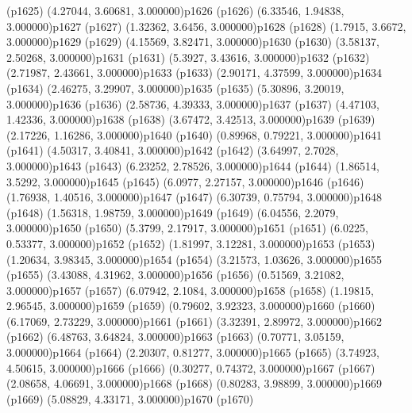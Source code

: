 \psdot(p1625)
\psPoint(4.27044, 3.60681, 3.000000){p1626}
\psdot(p1626)
\psPoint(6.33546, 1.94838, 3.000000){p1627}
\psdot(p1627)
\psPoint(1.32362, 3.6456, 3.000000){p1628}
\psdot(p1628)
\psPoint(1.7915, 3.6672, 3.000000){p1629}
\psdot(p1629)
\psPoint(4.15569, 3.82471, 3.000000){p1630}
\psdot(p1630)
\psPoint(3.58137, 2.50268, 3.000000){p1631}
\psdot(p1631)
\psPoint(5.3927, 3.43616, 3.000000){p1632}
\psdot(p1632)
\psPoint(2.71987, 2.43661, 3.000000){p1633}
\psdot(p1633)
\psPoint(2.90171, 4.37599, 3.000000){p1634}
\psdot(p1634)
\psPoint(2.46275, 3.29907, 3.000000){p1635}
\psdot(p1635)
\psPoint(5.30896, 3.20019, 3.000000){p1636}
\psdot(p1636)
\psPoint(2.58736, 4.39333, 3.000000){p1637}
\psdot(p1637)
\psPoint(4.47103, 1.42336, 3.000000){p1638}
\psdot(p1638)
\psPoint(3.67472, 3.42513, 3.000000){p1639}
\psdot(p1639)
\psPoint(2.17226, 1.16286, 3.000000){p1640}
\psdot(p1640)
\psPoint(0.89968, 0.79221, 3.000000){p1641}
\psdot(p1641)
\psPoint(4.50317, 3.40841, 3.000000){p1642}
\psdot(p1642)
\psPoint(3.64997, 2.7028, 3.000000){p1643}
\psdot(p1643)
\psPoint(6.23252, 2.78526, 3.000000){p1644}
\psdot(p1644)
\psPoint(1.86514, 3.5292, 3.000000){p1645}
\psdot(p1645)
\psPoint(6.0977, 2.27157, 3.000000){p1646}
\psdot(p1646)
\psPoint(1.76938, 1.40516, 3.000000){p1647}
\psdot(p1647)
\psPoint(6.30739, 0.75794, 3.000000){p1648}
\psdot(p1648)
\psPoint(1.56318, 1.98759, 3.000000){p1649}
\psdot(p1649)
\psPoint(6.04556, 2.2079, 3.000000){p1650}
\psdot(p1650)
\psPoint(5.3799, 2.17917, 3.000000){p1651}
\psdot(p1651)
\psPoint(6.0225, 0.53377, 3.000000){p1652}
\psdot(p1652)
\psPoint(1.81997, 3.12281, 3.000000){p1653}
\psdot(p1653)
\psPoint(1.20634, 3.98345, 3.000000){p1654}
\psdot(p1654)
\psPoint(3.21573, 1.03626, 3.000000){p1655}
\psdot(p1655)
\psPoint(3.43088, 4.31962, 3.000000){p1656}
\psdot(p1656)
\psPoint(0.51569, 3.21082, 3.000000){p1657}
\psdot(p1657)
\psPoint(6.07942, 2.1084, 3.000000){p1658}
\psdot(p1658)
\psPoint(1.19815, 2.96545, 3.000000){p1659}
\psdot(p1659)
\psPoint(0.79602, 3.92323, 3.000000){p1660}
\psdot(p1660)
\psPoint(6.17069, 2.73229, 3.000000){p1661}
\psdot(p1661)
\psPoint(3.32391, 2.89972, 3.000000){p1662}
\psdot(p1662)
\psPoint(6.48763, 3.64824, 3.000000){p1663}
\psdot(p1663)
\psPoint(0.70771, 3.05159, 3.000000){p1664}
\psdot(p1664)
\psPoint(2.20307, 0.81277, 3.000000){p1665}
\psdot(p1665)
\psPoint(3.74923, 4.50615, 3.000000){p1666}
\psdot(p1666)
\psPoint(0.30277, 0.74372, 3.000000){p1667}
\psdot(p1667)
\psPoint(2.08658, 4.06691, 3.000000){p1668}
\psdot(p1668)
\psPoint(0.80283, 3.98899, 3.000000){p1669}
\psdot(p1669)
\psPoint(5.08829, 4.33171, 3.000000){p1670}
\psdot(p1670)
